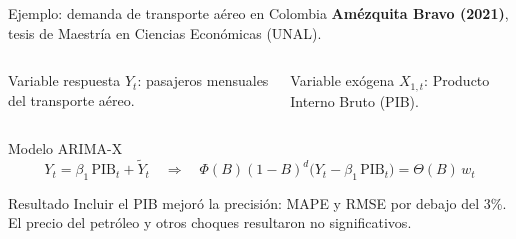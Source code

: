 \documentclass[aspectratio=169,11pt]{beamer}
\begin{document}
\begin{frame}[t]{Ejemplo: demanda de transporte aéreo en Colombia}
  \vspace{3mm}
  \textbf{Amézquita Bravo (2021)}, tesis de Maestría en Ciencias Económicas (UNAL).
  \vspace{2mm}
  \begin{columns}[T]
    \begin{block}{Variable respuesta}
      $Y_t$: pasajeros mensuales del transporte aéreo.
    \end{block}
    \begin{block}{Variable exógena}
      $X_{1,t}$: Producto Interno Bruto (PIB).
    \end{block}
  \end{columns}
  \vspace{4mm}
  \begin{block}{Modelo ARIMA-X}
    \vspace{-2mm}
    \[
      Y_t = \beta_1\,\mathrm{PIB}_t + \tilde{Y}_t
      \quad\Longrightarrow\quad
      \Phi(B)(1-B)^d\big(Y_t - \beta_1\,\mathrm{PIB}_t\big) = \Theta(B)\,w_t
    \]
  \end{block}
  \vspace{4mm}
  \begin{exampleblock}{Resultado}
    Incluir el PIB mejoró la precisión: MAPE y RMSE por debajo del 3\%. El precio del petróleo y otros choques resultaron no significativos.
  \end{exampleblock}
\end{frame}
\end{document}
